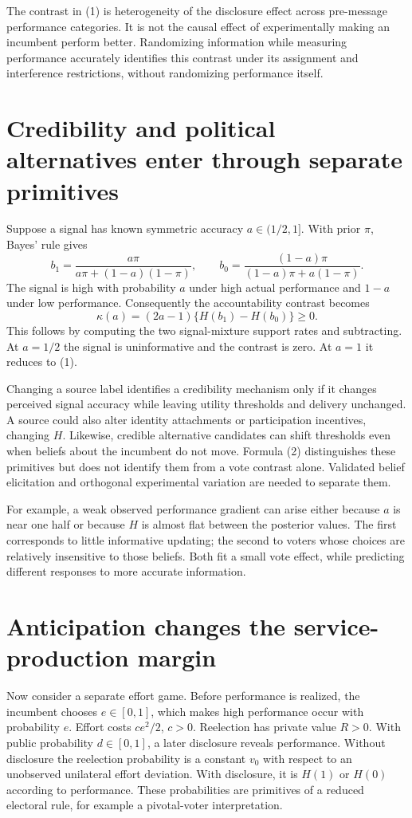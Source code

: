 \documentclass[11pt,a4paper]{article}
\begin{document}
The contrast in (1) is heterogeneity of the disclosure effect across pre-message performance categories. It is not the causal effect of experimentally making an incumbent perform better. Randomizing information while measuring performance accurately identifies this contrast under its assignment and interference restrictions, without randomizing performance itself.

\section{Credibility and political alternatives enter through separate primitives}
Suppose a signal has known symmetric accuracy $a\in(1/2,1]$. With prior $\pi$, Bayes' rule gives
\[
 b_1=\frac{a\pi}{a\pi+(1-a)(1-\pi)},\qquad
 b_0=\frac{(1-a)\pi}{(1-a)\pi+a(1-\pi)}.
\]
The signal is high with probability $a$ under high actual performance and $1-a$ under low performance. Consequently the accountability contrast becomes
\[
 \kappa(a)=(2a-1)\{H(b_1)-H(b_0)\}\ge0. \tag{2}
\]
This follows by computing the two signal-mixture support rates and subtracting. At $a=1/2$ the signal is uninformative and the contrast is zero. At $a=1$ it reduces to (1).

Changing a source label identifies a credibility mechanism only if it changes perceived signal accuracy while leaving utility thresholds and delivery unchanged. A source could also alter identity attachments or participation incentives, changing $H$. Likewise, credible alternative candidates can shift thresholds even when beliefs about the incumbent do not move. Formula (2) distinguishes these primitives but does not identify them from a vote contrast alone. Validated belief elicitation and orthogonal experimental variation are needed to separate them.

For example, a weak observed performance gradient can arise either because $a$ is near one half or because $H$ is almost flat between the posterior values. The first corresponds to little informative updating; the second to voters whose choices are relatively insensitive to those beliefs. Both fit a small vote effect, while predicting different responses to more accurate information.

\section{Anticipation changes the service-production margin}
Now consider a separate effort game. Before performance is realized, the incumbent chooses $e\in[0,1]$, which makes high performance occur with probability $e$. Effort costs $ce^2/2$, $c>0$. Reelection has private value $R>0$. With public probability $d\in[0,1]$, a later disclosure reveals performance. Without disclosure the reelection probability is a constant $v_0$ with respect to an unobserved unilateral effort deviation. With disclosure, it is $H(1)$ or $H(0)$ according to performance. These probabilities are primitives of a reduced electoral rule, for example a pivotal-voter interpretation.
\end{document}
